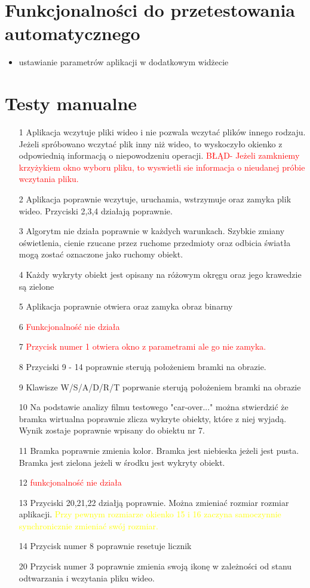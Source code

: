 \documentclass[11pt,a4paper]{article}
\begin{document}
\section{Funkcjonalności do przetestowania automatycznego}
\begin{itemize}
\item ustawianie parametrów aplikacji w dodatkowym widżecie
\end{itemize}

\section{Testy manualne}
\begin{enumerate}
\item[1] Aplikacja wczytuje pliki wideo i nie pozwala wczytać plików innego rodzaju. Jeżeli spróbowano wczytać plik inny niż wideo, to wyskoczyło okienko z odpowiednią informacją o niepowodzeniu operacji.  \textcolor{red}{BŁĄD- Jeżeli zamkniemy krzyżykiem okno wyboru pliku, to wyswietli  sie informacja o nieudanej próbie wczytania pliku.}
\item[2] Aplikacja poprawnie wczytuje, uruchamia, wstrzymuje oraz zamyka plik wideo. Przyciski 2,3,4 działają poprawnie.
\item[3] Algorytm nie działa poprawnie w każdych warunkach. Szybkie zmiany oświetlenia, cienie  rzucane przez ruchome przedmioty oraz odbicia światła mogą zostać oznaczone jako ruchomy obiekt. 
\item[4] Każdy  wykryty obiekt jest opisany na różowym okręgu oraz jego krawedzie są zielone
\item[5]  Aplikacja poprawnie otwiera oraz zamyka obraz binarny
\item[6]  \textcolor{red}{Funkcjonalność nie działa}
\item[7] \textcolor{red}{ Przycisk numer 1 otwiera okno z parametrami ale go nie zamyka.}
\item[8] Przyciski 9 - 14 poprawnie sterują położeniem bramki na obrazie.
\item[9] Klawisze W/S/A/D/R/T poprwanie sterują położeniem bramki na obrazie
\item[10] Na podstawie analizy filmu testowego "car-over..." można stwierdzić że bramka wirtualna poprawnie zlicza wykryte obiekty, które z niej wyjadą. Wynik zostaje poprawnie wpisany do obiektu nr 7.
\item[11] Bramka poprawnie zmienia kolor. Bramka jest niebieska jeżeli jest pusta. Bramka jest zielona jeżeli w środku jest wykryty obiekt.
\item[12] \textcolor{red}{funkcjonalność nie działa}
\item[13] Przyciski 20,21,22 działją poprawnie. Można zmieniać rozmiar rozmiar aplikacji. \textcolor{yellow}{Przy pewnym rozmiarze okienko 15 i 16 zaczyna samoczynnie synchronicznie zmieniać swój rozmiar.}
\item[14] Przycisk numer 8 poprawnie resetuje licznik
\item[20] Przycisk numer 3 poprawnie zmienia swoją ikonę w zależności od stanu odtwarzania i wczytania pliku wideo.


\end{enumerate}
\end{document}
